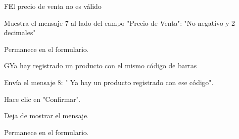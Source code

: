 \begin{UCtrayectoriaA}{F}{El precio de venta no es válido}
	
	\UCpaso[\UCsist] Muestra el mensaje 7 al lado del campo "Precio de Venta": "No negativo y 2 decimales"

	\UCpaso[] Permanece en el formulario.

\end{UCtrayectoriaA}

\begin{UCtrayectoriaA}{G}{Ya hay registrado un producto con el mismo código de barras}
	
	\UCpaso[\UCsist] Envía el mensaje 8: " Ya hay un producto registrado con ese código".
	
	\UCpaso[\UCactor] Hace clic en "Confirmar".

	\UCpaso[\UCsist] Deja de mostrar el mensaje.

	\UCpaso[] Permanece en el formulario.

\end{UCtrayectoriaA}